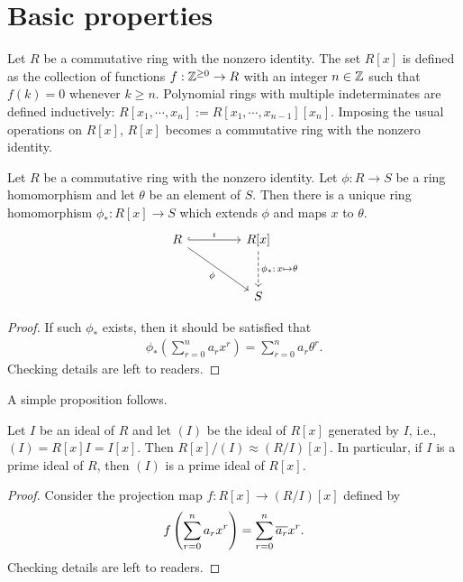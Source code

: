 \section{Basic properties}

\begin{defi}
    Let $R$ be a commutative ring with the nonzero identity.
    The set $R[x]$ is defined as the collection of functions $f: {\mathbb{Z}}^{\geq 0}\rightarrow R$ with an integer $n\in{\mathbb{Z}}$ such that $f(k)=0$ whenever $k\geq n$.
    Polynomial rings with multiple indeterminates are defined inductively: $R[x_1, \cdots, x_n]:=R[x_1, \cdots, x_{n-1}][x_n]$.
    Imposing the usual operations on $R[x]$, $R[x]$ becomes a commutative ring with the nonzero identity.
\end{defi}
\begin{prop}
    Let $R$ be a commutative ring with the nonzero identity.
    Let $\phi: R\rightarrow S$ be a ring homomorphism and let $\theta$ be an element of $S$.
    Then there is a unique ring homomorphism $\phi_*: R[x]\rightarrow S$ which extends $\phi$ and maps $x$ to $\theta$.
    \begin{equation*}
    \begin{tikzcd}[row sep=1.0cm, column sep=1.5cm]
        R\arrow[r, "\imath", hook]\arrow[dr, "\phi"']
        &
        R[x]\arrow[d, "\phi_*:\,x\mapsto\theta", dashed]\\
        &
        S
    \end{tikzcd}
    \end{equation*}
\end{prop}
\begin{proof}
    If such $\phi_*$ exists, then it should be satisfied that
    \begin{align*}
        \phi_*\left(\sum_{r=0}^n a_rx^r\right)=\sum_{r=0}^n a_r\theta^r.
    \end{align*}
    \color{brown}Checking details are left to readers.\color{black}
\end{proof}

A simple proposition follows.
\begin{prop}
    Let $I$ be an ideal of $R$ and let $(I)$ be the ideal of $R[x]$ generated by $I$, i.e., $(I)=R[x]I=I[x]$.
    Then $R[x]/(I)\approx(R/I)[x]$.
    In particular, if $I$ is a prime ideal of $R$, then $(I)$ is a prime ideal of $R[x]$.
\end{prop}
\begin{proof}
    Consider the projection map $f: R[x]\rightarrow(R/I)[x]$ defined by
    \begin{align*}
        f\left(\sum_{r=0}^n a_rx^r\right)=\sum_{r=0}^n \overline{a_r}x^r.
    \end{align*}
    \color{brown}Checking details are left to readers.\color{black}
\end{proof}

